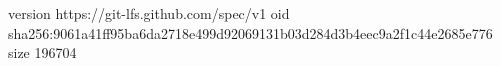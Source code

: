 version https://git-lfs.github.com/spec/v1
oid sha256:9061a41ff95ba6da2718e499d92069131b03d284d3b4eec9a2f1c44e2685e776
size 196704
